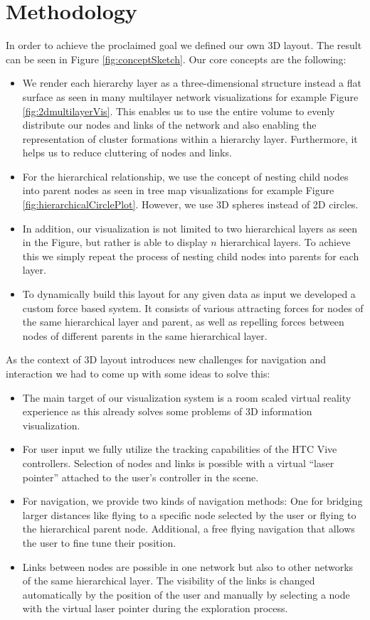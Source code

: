 \section{Methodology}
In order to achieve the proclaimed goal we defined our own 3D layout. The result can be seen in Figure \ref{fig:conceptSketch}. Our core concepts are the following: 
\begin{itemize}
    \item We render each hierarchy layer as a three-dimensional structure instead a flat surface as seen in many multilayer network visualizations for example Figure \ref{fig:2dmultilayerVis}. This enables us to use the entire volume to evenly distribute our nodes and links of the network and also enabling the representation of cluster formations within a hierarchy layer. Furthermore, it helps us to reduce cluttering of nodes and links.
    \item For the hierarchical relationship, we use the concept of nesting child nodes into parent nodes as seen in tree map visualizations for example Figure \ref{fig:hierarchicalCirclePlot}. However, we use 3D spheres instead of 2D circles. 
    \item In addition, our visualization is not limited to two hierarchical layers as seen in the Figure, but rather is able to display $n$ hierarchical layers. To achieve this we simply repeat the process of nesting child nodes into parents for each layer.
    \item To dynamically build this layout for any given data as input we developed a custom force based system. It consists of various attracting forces for nodes of the same hierarchical layer and parent, as well as repelling forces between nodes of different parents in the same hierarchical layer.
\end{itemize}
As the context of 3D layout introduces new challenges for navigation and interaction we had to come up with some ideas to solve this: 
\begin{itemize}
    \item The main target of our visualization system is a room scaled virtual reality experience as this already solves some problems of 3D information visualization.
    \item For user input we fully utilize the tracking capabilities of the HTC Vive controllers. Selection of nodes and links is possible with a virtual “laser pointer” attached to the user's controller in the scene.
    \item For navigation, we provide two kinds of navigation methods: One for bridging larger distances like flying to a specific node selected by the user or flying to the hierarchical parent node. Additional, a free flying navigation that allows the user to fine tune their position.
    \item Links between nodes are possible in one network but also to other networks of the same hierarchical layer. The visibility of the links is changed automatically by the position of the user and manually by selecting a node with the virtual laser pointer during the exploration process. 
\end{itemize}
